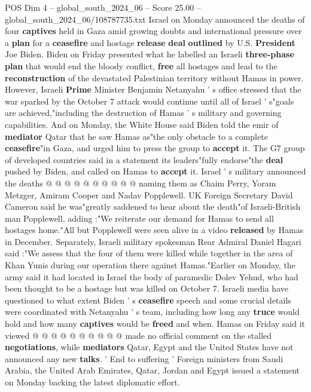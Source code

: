 \begin{textsample}{POS Dim 4 – global\_south\_2024\_06 – Score 25.00 – global\_south\_2024\_06/108787735.txt}  \label{ex:f4_pos_086}
Israel on Monday announced the deaths of four \textbf{captives} held in Gaza amid growing doubts and international pressure over a \textbf{plan} for a \textbf{ceasefire} and hostage \textbf{release} \textbf{deal} \textbf{outlined} by U.S. \textbf{President} Joe Biden.
Biden on Friday presented what he labelled an Israeli \textbf{three-phase} \textbf{plan} that would end the bloody conflict, \textbf{free} all hostages and lead to the \textbf{reconstruction} of the devastated Palestinian territory without Hamas in power.
However, Israeli \textbf{Prime} Minister Benjamin Netanyahu ' s office stressed that the war sparked by the October 7 attack would continue until all of Israel ' s"goals are achieved,"including the destruction of Hamas ' s military and governing capabilities.
And on Monday, the White House said Biden told the emir of \textbf{mediator} Qatar that he saw Hamas as"the only obstacle to a complete \textbf{ceasefire}"in Gaza, and urged him to press the group to \textbf{accept} it.
The G7 group of developed countries said in a statement its leaders"fully endorse"the \textbf{deal} pushed by Biden, and called on Hamas to \textbf{accept} it.
Israel ' s military announced the deaths @ @ @ @ @ @ @ @ @ @ naming them as Chaim Perry, Yoram Metzger, Amiram Cooper and Nadav Popplewell.
UK Foreign Secretary David Cameron said he was"greatly saddened to hear about the death"of Israeli-British man Popplewell, adding :"We reiterate our demand for Hamas to send all hostages home."All but Popplewell were seen alive in a video \textbf{released} by Hamas in December.
Separately, Israeli military spokesman Rear Admiral Daniel Hagari said :"We assess that the four of them were killed while together in the area of Khan Yunis during our operation there against Hamas."Earlier on Monday, the army said it had located in Israel the body of paramedic Dolev Yehud, who had been thought to be a hostage but was killed on October 7.
Israeli media have questioned to what extent Biden ' s \textbf{ceasefire} speech and some crucial details were coordinated with Netanyahu ' s team, including how long any \textbf{truce} would hold and how many \textbf{captives} would be \textbf{freed} and when.
Hamas on Friday said it viewed @ @ @ @ @ @ @ @ @ @ made no official comment on the stalled \textbf{negotiations}, while \textbf{mediators} Qatar, Egypt and the United States have not announced any new \textbf{talks}. ' End to suffering ' Foreign ministers from Saudi Arabia, the United Arab Emirates, Qatar, Jordan and Egypt issued a statement on Monday backing the latest diplomatic effort.

\end{textsample}
